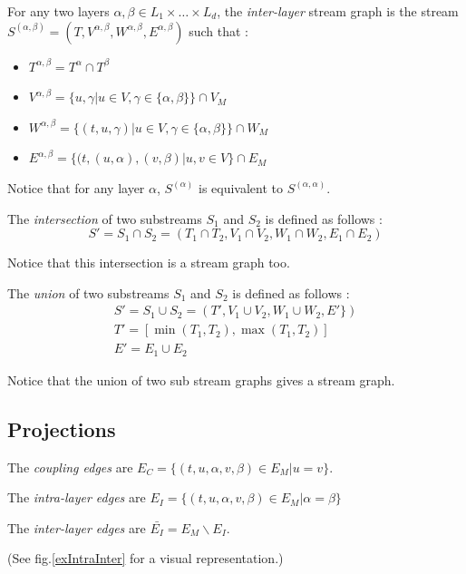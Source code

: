 \documentclass[dvipsnames,a4paper,11pt]{article}
\theoremstyle{definition}
\theoremstyle{remark}
\theoremstyle{remark}
\begin{document}
	For any two layers $\alpha, \beta \in L_1\times \dots\times L_d$, the {\em inter-layer} stream graph is the stream $S^{(\alpha,\beta)} = (T, V^{\alpha,\beta},W^{\alpha,\beta},E^{\alpha,\beta})$ such that :
	\begin{itemize}
		\item $T^{\alpha,\beta}=T^{\alpha}\cap T^{\beta}$
		\item $V^{\alpha,\beta} = \{u,\gamma | u \in V, \gamma \in \{\alpha,\beta\} \} \cap V_M$
		\item $W^{\alpha,\beta}= \{(t,u,\gamma) | u \in V, \gamma \in \{\alpha,\beta\} \} \cap W_M$
	    \item $E^{\alpha,\beta} = \{(t,(u,\alpha),(v,\beta) | u,v \in V\} \cap E_M $
	\end{itemize}

	    Notice that for any layer $\alpha$, $S^{(\alpha)}$ is equivalent to $S^{(\alpha,\alpha)}$.



	The {\em intersection} of two substreams $S_1$ and $S_2$ is defined as follows :
	\[
		S' = S_1 \cap S_2 = (T_1\cap T_2, V_1 \cap V_2, W_1 \cap W_2, E_1\cap E_2)
	\]

	Notice that this intersection is a stream graph too.

	The {\em union} of two substreams $S_1$ and $S_2$ is defined as follows :
	\begin{align*}
		S' = S_1 \cup S_2 = (T', V_1 \cup V_2, W_1 \cup W_2, E' \})\\
		T' = [\min(T_1,T_2),\max(T_1,T_2)]\\
		E' = E_1 \cup E_2 
	\end{align*}

	Notice that the union of two sub stream graphs gives a stream graph.

	

	\subsection{Projections }

    The {\em coupling edges} are $E_C=\{(t,u,\alpha,v,\beta)\in E_M | u=v\}$.

    The {\em intra-layer edges} are $E_I = \{(t,u,\alpha,v,\beta) \in E_M | \alpha = \beta \}$

    The {\em inter-layer edges} are $\bar{E_I} = E_M\backslash E_I$.
    
	(See fig.\ref{exIntraInter} for a visual representation.)
	
\end{document}
